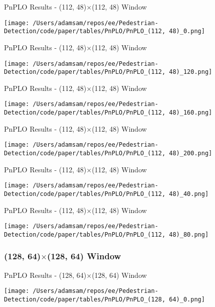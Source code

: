 \begin{table}
    \caption{PnPLO Results - (112, 48)$\times$(112, 48) Window}
    \texttt{[image: /Users/adamsam/repos/ee/Pedestrian-Detection/code/paper/tables/PnPLO/PnPLO\_(112, 48)\_0.png]}
    \label{tab:PnPLO_(112, 48)_0}
\end{table}

\begin{table}
    \caption{PnPLO Results - (112, 48)$\times$(112, 48) Window}
    \texttt{[image: /Users/adamsam/repos/ee/Pedestrian-Detection/code/paper/tables/PnPLO/PnPLO\_(112, 48)\_120.png]}
    \label{tab:PnPLO_(112, 48)_120}
\end{table}

\begin{table}
    \caption{PnPLO Results - (112, 48)$\times$(112, 48) Window}
    \texttt{[image: /Users/adamsam/repos/ee/Pedestrian-Detection/code/paper/tables/PnPLO/PnPLO\_(112, 48)\_160.png]}
    \label{tab:PnPLO_(112, 48)_160}
\end{table}

\begin{table}
    \caption{PnPLO Results - (112, 48)$\times$(112, 48) Window}
    \texttt{[image: /Users/adamsam/repos/ee/Pedestrian-Detection/code/paper/tables/PnPLO/PnPLO\_(112, 48)\_200.png]}
    \label{tab:PnPLO_(112, 48)_200}
\end{table}

\begin{table}
    \caption{PnPLO Results - (112, 48)$\times$(112, 48) Window}
    \texttt{[image: /Users/adamsam/repos/ee/Pedestrian-Detection/code/paper/tables/PnPLO/PnPLO\_(112, 48)\_40.png]}
    \label{tab:PnPLO_(112, 48)_40}
\end{table}

\begin{table}
    \caption{PnPLO Results - (112, 48)$\times$(112, 48) Window}
    \texttt{[image: /Users/adamsam/repos/ee/Pedestrian-Detection/code/paper/tables/PnPLO/PnPLO\_(112, 48)\_80.png]}
    \label{tab:PnPLO_(112, 48)_80}
\end{table}

\subsubsection*{(128, 64)$\times$(128, 64) Window}

\begin{table}
    \caption{PnPLO Results - (128, 64)$\times$(128, 64) Window}
    \texttt{[image: /Users/adamsam/repos/ee/Pedestrian-Detection/code/paper/tables/PnPLO/PnPLO\_(128, 64)\_0.png]}
    \label{tab:PnPLO_(128, 64)_0}
\end{table}

